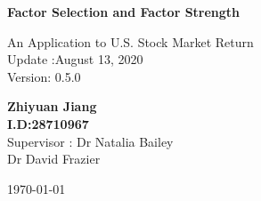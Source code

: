 \begin{titlepage}
\begin{center}
\vspace*{1cm}
\Huge
\textbf{Factor Selection and Factor Strength}

\vspace{0.5cm}
\LARGE
An Application to U.S. Stock Market Return\\
\Large
Update :August 13, 2020 \\
Version: 0.5.0

\vspace{1.5 cm}
\textbf{Zhiyuan Jiang\\I.D:28710967}\\
\vfill
 Supervisor : Dr Natalia Bailey\\\hspace{30mm} Dr David Frazier
 \vspace{0.8cm}
 
\Large
\today

\end{center}
\end{titlepage}